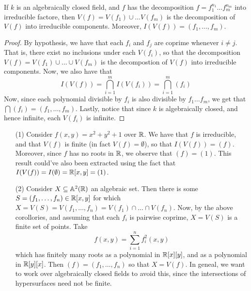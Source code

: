 \begin{corollary}
    If $k$ is an algebraically closed field, and $f$ has the decomposition
    $f=f_1^{n_1} \dots f_m^{n_m}$ into irreducible factore, then $V(f)=V(f_1)
    \cup \dots V(f_m)$ is the decomposition of $V(f)$ into irreducible
    components. Moreover, $I(V(f))=(f_1, \dots, f_m)$.
\end{corollary}
\begin{proof}
    By hypothesis, we have that each $f_i$ and $f_j$ are coprime whenever $i
    \neq j$. That is, there exist no inclusions under each $V(f_i)$, so that the
    decomposition $V(f)=V(f_1) \cup \dots \cup V(f_m)$ is the decompostion of
    $V(f)$ into irreducible components. Now, we also have that
    \begin{equation*}
        I(V(f))=\bigcap_{i=1}^m{I(V(f_i))}=\bigcap_{i=1}^m{(f_i)}
    \end{equation*}
    Now, since each polynomial divisible by $f_i$ is also divisible by $f_1
    \dots f_m$, we get that $\bigcap{(f_i)}=(f_1, \dots, f_m)$. Lastly, notice
    that since $k$ is algebraically closed, and hence infinite, each $V(f_i)$ is
    infinite.
\end{proof}

\begin{example}\label{example_1.14}
    \begin{enumerate}
        \item[(1)] Consider $f(x,y)=x^2+y^2+1$ over $\mathbb{R}$. We have that $f$ is
            irreducible, and that $V(f)$ is finite (in fact $V(f)=\emptyset$),
            so that $I(V(f))=(f)$. Moreover, since $f$ has no roots in $\mathbb{R}$, we
            observe that $(f)=(1)$. This result could've also been extracted
            using the fact that $I(V(f))=I(\emptyset)=\mathbb{R}[x,y]=(1)$.

        \item[(2)] Consider $X \subseteq \mathbb{A}^2(\mathbb{R})$ an algebraic set. Then there
            is some $S=(f_1, \dots, f_n) \in \mathbb{R}[x,y]$ for which $X=V(S)=V(f_1,
            \dots, f_n)=V(f_1) \cap \dots \cap V(f_n)$. Now, by the above
            corollories, and assuming that each $f_i$ is pairwise coprime,
            $X=V(S)$ is a finite set of points. Take
            \begin{equation*}
                f(x,y)=\sum_{i=1}^n{f_i^2(x,y)}
            \end{equation*}
            which has finitely many roots as a polynomial in $\mathbb{R}[x][y]$, and as
            a polynomial in $\mathbb{R}[y][x]$. Then $(f)=(f_1, \dots ,f_n)$ so that
            $X=V(f)$. In geneal, we want to work over algebraically closed
            fields to avoid this, since the intersections of hypersurfaces need
            not be finite.
    \end{enumerate}
\end{example}

